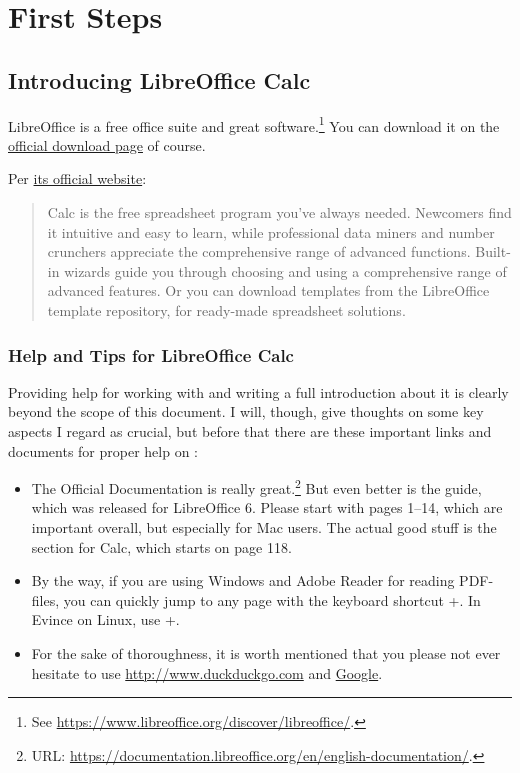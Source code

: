 \section{First Steps}
\label{sec:First-Steps}

\subsection{Introducing LibreOffice Calc}
\label{subsec:introducing-libreoffice-calc}

LibreOffice is a free office suite and great software.\footnote{See \href{https://www.libreoffice.org/discover/libreoffice/}{https://www.libreoffice.org/discover/libreoffice/}.}
You can download it on the  \href{https://www.libreoffice.org/download/download/}{official download page} of course.

Per \href{https://www.libreoffice.org/discover/calc/}{its official website}:
\begin{quote}\small
	Calc is the free spreadsheet program you've always needed. Newcomers find it intuitive and easy to learn, while professional data miners and number crunchers appreciate the comprehensive range of advanced functions. Built-in wizards guide you through choosing and using a comprehensive range of advanced features. Or you can download templates from the LibreOffice template repository, for ready-made spreadsheet solutions.
\end{quote}

\subsubsection{Help and Tips for LibreOffice Calc}
\label{subsubsec:help-tips-for-libreoffice-calc}

Providing help for working with \loc and writing a full introduction about it is clearly beyond the scope of this document.
I will, though, give thoughts on some key aspects I regard as crucial, but before that there are these important links and documents for proper help on \loc:
\begin{itemize}
	\item The Official Documentation is really great.\footnote{URL: \href{https://documentation.libreoffice.org/en/english-documentation/}{https://documentation.libreoffice.org/en/english-documentation/}.}
	But even better is the  guide, which was released for LibreOffice 6.
	Please start with pages 1--14, which are important overall, but especially for Mac users.
	The actual good stuff is the section for Calc, which starts on page 118.
	\item By the way, if you are using Windows and Adobe Reader for reading PDF-files, you can quickly jump to any page with the keyboard shortcut +.
	In Evince on Linux, use +.
	\item For the sake of thoroughness, it is worth mentioned that you please not ever hesitate to use \href{http://www.duckduckgo.com}{http://www.duckduckgo.com} and  \href{https://www.google.com}{Google}.
\end{itemize}

